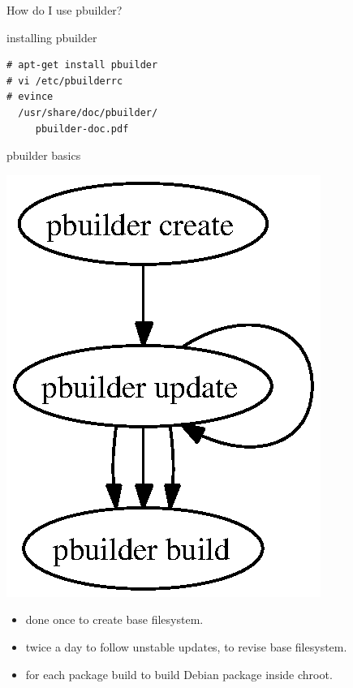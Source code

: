 \documentclass[dvipdfm,17pt,times]{beamer}
\newcommand{\emtext}[1]{
\begin{frame}{}
 
{\Huge #1
}
\end{frame}
}
\begin{document}
\emtext{How do I use pbuilder?}

\begin{frame}[containsverbatim]{installing pbuilder}
\begin{verbatim}
# apt-get install pbuilder
# vi /etc/pbuilderrc
# evince 
  /usr/share/doc/pbuilder/
     pbuilder-doc.pdf	
\end{verbatim}
\end{frame}

\begin{frame}{pbuilder basics}
\begin{minipage}{0.4\hsize}
\includegraphics[height=0.7\vsize]{pbuildercycle.eps}
\end{minipage}
\begin{minipage}{0.55\hsize}
\begin{itemize}
 \item done once to create base filesystem.
 \item twice a day to follow unstable updates, to revise base
       filesystem.
 \item for each package build to build Debian package inside chroot.
\end{itemize}
\end{minipage}
\end{frame}
\end{document}
